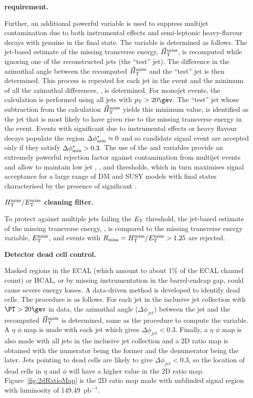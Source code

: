 {\bf \bdphi requirement.} 

Further, an additional powerful variable \bdphi is used to suppress
multijet contamination due to both instrumental effects and
semi-leptonic heavy-flavour decays with genuine \met in the final
state. The variable is determined as follows. The jet-based estimate
of the missing transverse energy, ${\mbox{$\vec{H}_{\rm T}^{\rm miss}$}}$, is recomputed while
ignoring one of the reconstructed jets (the ``test'' jet). The
difference in the azimuthal angle between the recomputed $\mbox{$\vec{H}_{\rm T}^{\rm miss}$}$
and the ``test'' jet is then determined. This process is repeated for
each jet in the event and the minimum of all the azimuthal
differences, \bdphi, is determined. For monojet events, the calculation is 
performed using all jets with $\Pt > 20\gev$. The ``test'' jet whose subtraction
from the calculation $\mbox{$\vec{H}_{\rm T}^{\rm miss}$}$ yields this minimum value, is
identified as the jet that is most likely to have given rise to the
missing transverse energy in the event. Events with significant \mht
due to instrumental effects or heavy flavour decays populate the
region $\mbox{$\Delta\phi^{*}_{\rm min}$} \approx 0$ and so candidate signal event are accepted
only if they satisfy $\mbox{$\Delta\phi^{*}_{\rm min}$} > 0.3$. The use of the \bdphi and \alphat
variables provide an extremely powerful rejection factor against
contamination from multijet events and allow to maintain low jet \PT,
\HT, and \mht thresholds, which in turn maximises signal acceptance
for a large range of DM and SUSY models with final states
characterised by the presence of significant \met.

{\bf $\mbox{$H_{\rm T}^{\rm miss}$}/\mbox{$E_\text{T}^{\rm miss}$}$ cleaning filter.} 

To protect against multiple jets failing the ${E_{\text T}}$ threshold, the jet-based
estimate of the missing transverse energy, \mht, is compared to the
missing transverse energy variable, $\mbox{$E_\text{T}^{\rm miss}$}$, and events with $R_{\rm
  miss}=\mbox{$H_{\rm T}^{\rm miss}$}/\mbox{$E_\text{T}^{\rm miss}$} > 1.25$ are rejected.
  
{\bf Detector dead cell control.}

Masked regions in the ECAL (which amount to about 1\% of the ECAL channel count)
or HCAL, or by missing instrumentation in the barrel-endcap gap, could cause 
severe energy losses. A data-driven method is developed to identify dead cells. The 
procedure is as follows. For each jet in the inclusive jet collection with
$\PT > 20 \gev$ in data, the azimuthal angle ($\Delta\phi_{jet}$) between the jet and the 
recomputed ${\mbox{$\vec{H}_{\rm T}^{\rm miss}$}}$ is determined, same as the procedure to compute the \bdphi 
variable. A $\eta$ $\phi$ map is made with each jet which gives $\Delta\phi_{jet} < 0.3$.
Finally, a $\eta$ $\phi$ map is also made with all jets in the inclusive jet collection and
a 2D ratio map is obtained with the numerator being the former and the denumerator being 
the later. Jets pointing to dead cells are likely to give $\Delta\phi_{jet} < 0.3$, so the
location of dead cells in $\eta$ and $\phi$ will have a higher value in the 2D ratio map. 
Figure~\ref{fig:2dRatioMap} is the 2D ratio map made with unblinded signal region with luminosity of 
149.49~$\text{pb}^{-1}$.

